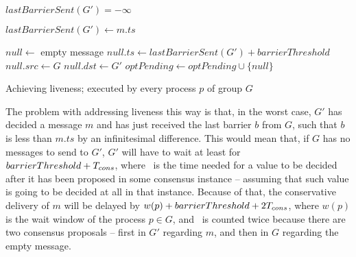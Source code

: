 \documentclass[times, 10pt]{article}
\begin{document}
\begin{algorithm}
\begin{distribalgo}[1]
\blankline
{}
    \STATE $lastBarrierSent(G') = -\infty$
  \ENDINDENT
\ENDINDENT

\blankline
{}
  \STATE $lastBarrierSent(G') \leftarrow m.ts$
\ENDINDENT

\blankline
{}
  \STATE $null \leftarrow$ empty message
  \STATE $null.ts \leftarrow lastBarrierSent(G') + barrierThreshold$ \label{algline:samenullid}
  \STATE $null.src \leftarrow G$
  \STATE $null.dst \leftarrow G'$ 
  \STATE $optPending \leftarrow optPending \cup \{null\}$
\ENDINDENT 

\blankline
\caption{Achieving liveness; executed by every process $p$ of group $G$}
\label{algorithm:liveness}
\end{distribalgo}
\end{algorithm}

The problem with addressing liveness this way is that, in the worst case, $G'$ has decided a message $m$ and has just received the last barrier $b$ from $G$, such that $b$ is less than $m.ts$ by an infinitesimal difference. This would mean that, if $G$ has no messages to send to $G'$, $G'$ will have to wait at least for $barrierThreshold + T_{cons}$, where \tcons\ is the time needed for a value to be decided after it has been proposed in some consensus instance -- assuming that such value is going to be decided at all in that instance. Because of that, the conservative delivery of $m$ will be delayed by $w(p) + barrierThreshold + 2T_{cons}$, where $w(p)$ is the wait window of the process $p \in G$, and \tcons\ is counted twice because there are two consensus proposals -- first in $G'$ regarding $m$, and then in $G$ regarding the empty message.
\end{document}

